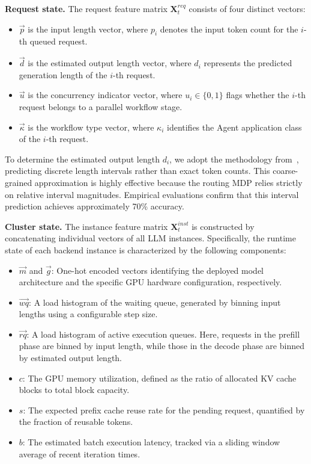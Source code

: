 \documentclass[sigconf,review,anonymous]{acmart}
\begin{document}
\textbf{Request state.} The request feature matrix $\mathbf{X}_t^{req}$ 
consists of four distinct vectors:
\begin{itemize}
\item $\vec{p}$ is the input length vector, where $p_i$ denotes the input token count for the $i$-th queued request.
\item $\vec{d}$ is the estimated output length vector, where $d_i$ represents the predicted generation length of the $i$-th request.
\item $\vec{u}$ is the concurrency indicator vector, where $u_i \in \{0, 1\}$ flags whether the $i$-th request belongs to a parallel workflow stage.
\item $\vec{\kappa}$ is the workflow type vector, where $\kappa_i$ identifies the Agent application class of the $i$-th request.
\end{itemize}

To determine the estimated output length $d_i$, we adopt the methodology 
from~\cite{jin2023s}, predicting discrete length intervals rather than exact 
token counts. This coarse-grained approximation is highly effective because 
the routing MDP relies strictly on relative interval magnitudes. Empirical 
evaluations confirm that this interval prediction achieves approximately 70\% accuracy.

\textbf{Cluster state.} The instance feature matrix $\mathbf{X}_t^{inst}$ is constructed by 
concatenating individual vectors of all LLM instances. Specifically, 
the runtime state of each backend instance is characterized by the following components:
\begin{itemize}
  \item $\vec{m}$ and $\vec{g}$: One-hot encoded vectors identifying the deployed model 
                    architecture and the specific GPU hardware configuration, respectively.
  \item $\vec{wq}$: A load histogram of the waiting queue, generated by binning input lengths 
                    using a configurable step size.
  \item $\vec{rq}$: A load histogram of active execution queues. Here, requests in 
                    the prefill phase are binned by input length, while those in the 
                    decode phase are binned by estimated output length.
  \item $c$: The GPU memory utilization, defined as the ratio of allocated KV 
          cache blocks to total block capacity.
  \item $s$: The expected prefix cache reuse rate for the pending request, 
            quantified by the fraction of reusable tokens.
  \item $b$: The estimated batch execution latency, tracked via a 
            sliding window average of recent iteration times.
\end{itemize}
\end{document}
